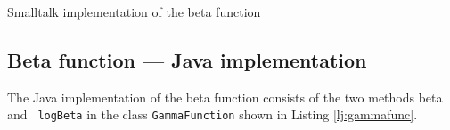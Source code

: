 \documentclass[twoside]{book}
\begin{document}
\begin{listing}
Smalltalk implementation of the beta function
\label{ls:betafunc}

\end{listing}

\subsection{Beta function --- Java implementation}
\label{secj:betafunc} The Java implementation of
the beta function consists of the two methods beta and {\tt
logBeta} in the class {\tt GammaFunction} shown in Listing
\ref{lj:gammafunc}.



\ifx\wholebook\relax\else
\end{document}
